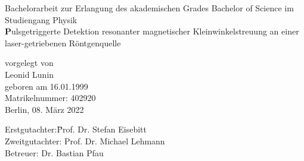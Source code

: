 \begin{titlepage}
\vspace{2cm}

\thispagestyle{empty}
\begin{center}

{\large Bachelorarbeit zur Erlangung des akademischen Grades
Bachelor of Science
im Studiengang Physik}\\
\vspace{1cm}
{\huge\textbf
Pulsgetriggerte Detektion resonanter magnetischer Kleinwinkelstreuung an einer laser-getriebenen Röntgenquelle}
\vspace{1.2cm}

{\large vorgelegt von\\
	 Leonid Lunin \\
	 geboren am 16.01.1999\\
	 Matrikelnummer: 402920\\[2cm]
	 Berlin, 08. März 2022\\[2cm]
}

\begin{minipage}{\linewidth} 
\begin{tabbing}
  		Erstgutachter:\quad \= Prof. Dr. Stefan Eisebitt\\[0.3cm]
  		Zweitgutachter: \> Prof. Dr. Michael Lehmann\\[0.3cm]
    	Betreuer:             \> Dr. Bastian Pfau \\
    						         
\end{tabbing}
\end{minipage}

\vspace{1.5cm}

\end{center}
\thispagestyle{empty}
\newpage
\setcounter{page}{1}
\end{titlepage}

\shipout\null

